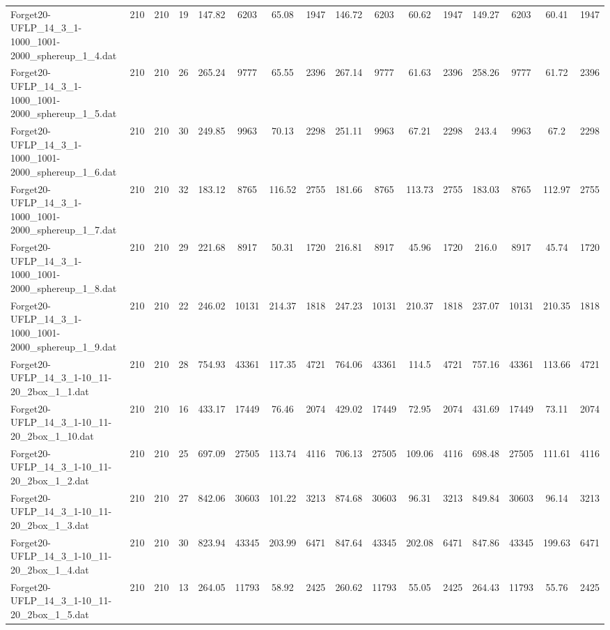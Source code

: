 \begin{sidewaystable}[!ht]
{\begin{tabular}{lccccccccccccccc}
Forget20-UFLP\_14\_3\_1-1000\_1001-2000\_sphereup\_1\_4.dat & 210 & 210 & 19 & 147.82 & 6203 & 65.08 & 1947 & 146.72 & 6203 & 60.62 & 1947 & 149.27 & 6203 & 60.41 & 1947 \\
Forget20-UFLP\_14\_3\_1-1000\_1001-2000\_sphereup\_1\_5.dat & 210 & 210 & 26 & 265.24 & 9777 & 65.55 & 2396 & 267.14 & 9777 &  \textcolor{blue2}{61.63} & 2396 & 258.26 & 9777 & 61.72 & 2396 \\
Forget20-UFLP\_14\_3\_1-1000\_1001-2000\_sphereup\_1\_6.dat & 210 & 210 & 30 & 249.85 & 9963 & 70.13 & 2298 & 251.11 & 9963 & 67.21 & 2298 & 243.4 & 9963 &  \textcolor{blue2}{67.2} & 2298 \\
Forget20-UFLP\_14\_3\_1-1000\_1001-2000\_sphereup\_1\_7.dat & 210 & 210 & 32 & 183.12 & 8765 & 116.52 & 2755 & 181.66 & 8765 & 113.73 & 2755 & 183.03 & 8765 &  \textcolor{blue2}{112.97} & 2755 \\
Forget20-UFLP\_14\_3\_1-1000\_1001-2000\_sphereup\_1\_8.dat & 210 & 210 & 29 & 221.68 & 8917 & 50.31 & 1720 & 216.81 & 8917 & 45.96 & 1720 & 216.0 & 8917 &  \textcolor{blue2}{45.74} & 1720 \\
Forget20-UFLP\_14\_3\_1-1000\_1001-2000\_sphereup\_1\_9.dat & 210 & 210 & 22 & 246.02 & 10131 & 214.37 & 1818 & 247.23 & 10131 & 210.37 & 1818 & 237.07 & 10131 &  \textcolor{blue2}{210.35} & 1818 \\
Forget20-UFLP\_14\_3\_1-10\_11-20\_2box\_1\_1.dat & 210 & 210 & 28 & 754.93 & 43361 & 117.35 & 4721 & 764.06 & 43361 & 114.5 & 4721 & 757.16 & 43361 & 113.66 & 4721 \\
Forget20-UFLP\_14\_3\_1-10\_11-20\_2box\_1\_10.dat & 210 & 210 & 16 & 433.17 & 17449 & 76.46 & 2074 & 429.02 & 17449 &  \textcolor{blue2}{72.95} & 2074 & 431.69 & 17449 & 73.11 & 2074 \\
Forget20-UFLP\_14\_3\_1-10\_11-20\_2box\_1\_2.dat & 210 & 210 & 25 & 697.09 & 27505 & 113.74 & 4116 & 706.13 & 27505 &  \textcolor{blue2}{109.06} & 4116 & 698.48 & 27505 & 111.61 & 4116 \\
Forget20-UFLP\_14\_3\_1-10\_11-20\_2box\_1\_3.dat & 210 & 210 & 27 & 842.06 & 30603 & 101.22 & 3213 & 874.68 & 30603 & 96.31 & 3213 & 849.84 & 30603 &  \textcolor{blue2}{96.14} & 3213 \\
Forget20-UFLP\_14\_3\_1-10\_11-20\_2box\_1\_4.dat & 210 & 210 & 30 & 823.94 & 43345 & 203.99 & 6471 & 847.64 & 43345 & 202.08 & 6471 & 847.86 & 43345 & 199.63 & 6471 \\
Forget20-UFLP\_14\_3\_1-10\_11-20\_2box\_1\_5.dat & 210 & 210 & 13 & 264.05 & 11793 & 58.92 & 2425 & 260.62 & 11793 &  \textcolor{blue2}{55.05} & 2425 & 264.43 & 11793 & 55.76 & 2425 \\

\end{tabular}}
\end{sidewaystable}
